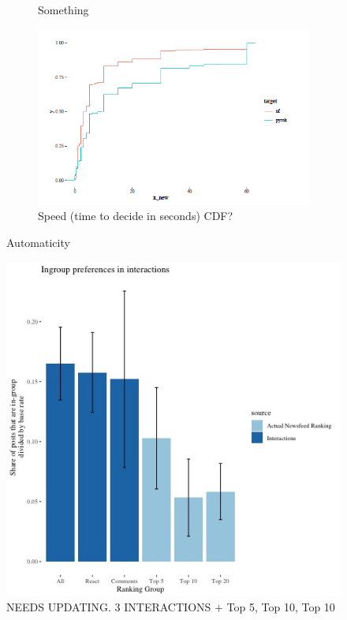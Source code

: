 \documentclass[12pt,letterpaper]{article}
\begin{document}
\begin{figure}
\begin{subfigure}{.5\textwidth}
        \caption{Something}
        \label{fig:sub-first}
    \end{subfigure}
    \begin{subfigure}{1\textwidth}
        \centering
        \includegraphics[width=.5\linewidth]{Output/Graphs/Experiments/Automaticity/speed cdf.png}  
        \caption{Speed (time to decide in seconds) CDF?}
        \label{fig:sub-second}
    \end{subfigure}
\caption{Automaticity}
\end{figure}


\begin{figure}[!h]
    \centering
    \includegraphics[width=1\linewidth]{Output/Graphs/Audit/Interactions/US preferences reactions and actual rankings above base rate.jpg}
    \caption{NEEDS UPDATING.  3 INTERACTIONS $+$ Top 5, Top 10, Top 10}
    \label{fig:behavior}
\end{figure}
\end{document}
